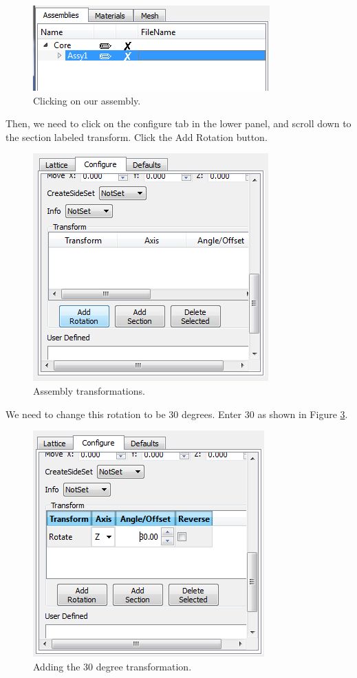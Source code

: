 \begin{figure}[H]
	\begin{center}
		\includegraphics[width=0.5\linewidth]{Images/hex-15.png}
		\caption{Clicking on our assembly.}
		\label{fig:Hex15}
	\end{center}
\end{figure}

Then, we need to click on the configure tab in the lower panel, and scroll down to the section labeled transform.  Click the Add Rotation button.

\begin{figure}[H]
	\begin{center}
		\includegraphics[width=0.5\linewidth]{Images/hex-16.png}
		\caption{Assembly transformations.}
		\label{fig:Hex16}
	\end{center}
\end{figure}

We need to change this rotation to be 30 degrees.  Enter 30 as shown in Figure \ref{fig:Hex17}.

\begin{figure}[H]
	\begin{center}
		\includegraphics[width=0.5\linewidth]{Images/hex-17.png}
		\caption{Adding the 30 degree transformation.}
		\label{fig:Hex17}
	\end{center}
\end{figure}

